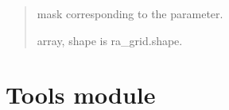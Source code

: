 \documentclass[letterpaper,10pt,english]{sphinxmanual}
\begin{document}
\begin{fulllineitems}
\begin{quote}
\begin{description}
\begin{itemize}
\end{itemize}

\sphinxAtStartPar
{} \textendash{} mask corresponding to the parameter.

\sphinxAtStartPar
array, shape is ra\_grid.shape.

\end{description}\end{quote}

\end{fulllineitems}


\sphinxstepscope


\chapter{Tools module}
\label{\detokenize{tools:module-tools}}\label{\detokenize{tools:tools-module}}\label{\detokenize{tools::doc}}
\end{document}
